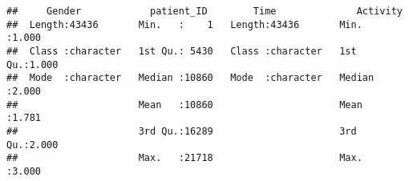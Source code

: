 \documentclass[
]{article}
\begin{document}
\begin{verbatim}
##     Gender            patient_ID        Time              Activity    
##  Length:43436       Min.   :    1   Length:43436       Min.   :1.000  
##  Class :character   1st Qu.: 5430   Class :character   1st Qu.:1.000  
##  Mode  :character   Median :10860   Mode  :character   Median :2.000  
##                     Mean   :10860                      Mean   :1.781  
##                     3rd Qu.:16289                      3rd Qu.:2.000  
##                     Max.   :21718                      Max.   :3.000
\end{verbatim}
\end{document}
